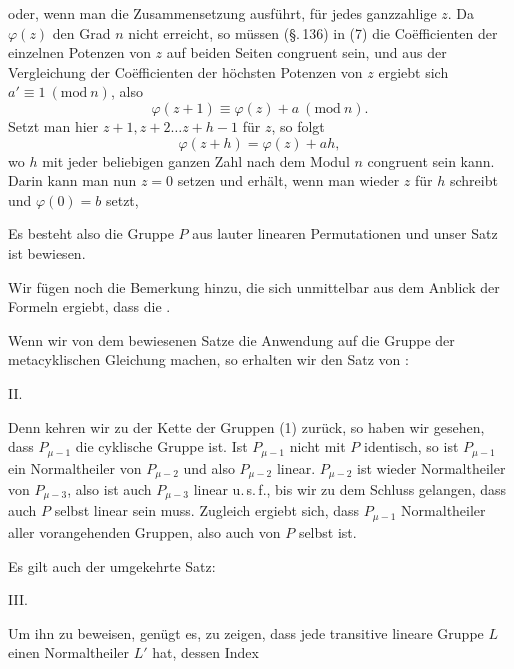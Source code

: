 
oder, wenn man die Zusammensetzung ausführt,
für jedes ganzzahlige $z$. Da $\varphi(z)$ den Grad $n$ nicht erreicht, so müssen (\S.\,136) in (7) die Co\"efficienten der einzelnen Potenzen von $z$ auf beiden Seiten congruent sein, und aus der Vergleichung der Co\"efficienten der höchsten Potenzen von $z$ ergiebt sich $a' \equiv 1\ (\mathrm{mod}\ n)$, also
\[
\varphi(z + 1) \equiv \varphi(z) + a\ (\mathrm{mod}\ n).
\]
Setzt man hier $z + 1, z + 2 \ldots z + h - 1$ für $z$, so folgt
\[
\varphi(z + h) = \varphi(z) + ah,
\]
wo $h$ mit jeder beliebigen ganzen Zahl nach dem Modul $n$ congruent sein kann. Darin kann man nun $z = 0$ setzen und erhält, wenn man wieder $z$ für $h$ schreibt und $\varphi(0) = b$ setzt,

Es besteht also die Gruppe $P$ aus lauter linearen Permutationen und unser Satz ist bewiesen.

Wir fügen noch die Bemerkung hinzu, die sich unmittelbar aus dem Anblick der Formeln ergiebt, dass die .

Wenn wir von dem bewiesenen Satze die Anwendung auf die Gruppe der metacyklischen Gleichung machen, so erhalten wir den Satz von :

II. 

Denn kehren wir zu der Kette der Gruppen (1) zurück, so haben wir gesehen, dass $P_{\mu - 1}$ die cyklische Gruppe ist. Ist $P_{\mu - 1}$ nicht mit $P$ identisch, so ist $P_{\mu - 1}$ ein Normaltheiler von $P_{\mu - 2}$ und also $P_{\mu - 2}$ linear. $P_{\mu - 2}$ ist wieder Normaltheiler von $P_{\mu - 3}$, also ist auch $P_{\mu - 3}$ linear u.\,s.\,f., bis wir zu dem Schluss gelangen, dass auch $P$ selbst linear sein muss. Zugleich ergiebt sich, dass $P_{\mu - 1}$ Normaltheiler aller vorangehenden Gruppen, also auch von $P$ selbst ist.

Es gilt auch der umgekehrte Satz:

III. 

Um ihn zu beweisen, genügt es, zu zeigen, dass jede transitive lineare Gruppe $L$ einen Normaltheiler $L'$ hat, dessen Index
